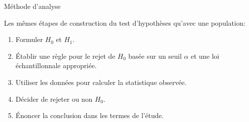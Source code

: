 \documentclass{BeamerTemplate}
\begin{document}
\begin{frame}[t]{Méthode d'analyse}

Les mêmes étapes de construction du test d'hypothèses qu'avec une population:

\vspace{0.3cm}
\begin{enumerate}[1)]\itemsep0.35cm
  \item Formuler  $H_0$ et $H_1$.
  \item Établir une règle pour le rejet de $H_0$ basée sur un seuil $\alpha$ et une loi échantillonnale appropriée.
  \item Utiliser les données  pour calculer la statistique observée.
  \item Décider de rejeter ou non  $H_0$.
  \item Énoncer la conclusion dans les termes de l'étude.
\end{enumerate}

\end{frame}
\end{document}

